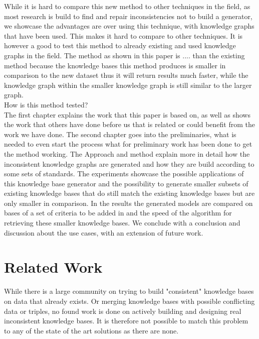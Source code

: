 \documentclass{article}
\begin{document}
While it is hard to compare this new method to other techniques in the field, as most research is build to find and repair inconsistencies not to build a generator, we showcase the advantages are over using this technique, with knowledge graphs that have been used. This makes it hard to compare to other techniques. It is however a good to test this method to already existing and used knowledge graphs in the field. The method as shown in this paper is .... than the existing method because the knowledge bases this method produces is smaller in comparison to the new dataset thus it will return results much faster, while the knowledge graph within the smaller knowledge graph is still similar to the larger graph.\\
How is this method tested?\\
The first chapter explains the work that this paper is based on, as well as shows the work that others have done before us that is related or could benefit from the work we have done. The second chapter goes into the preliminaries, what is needed to even start the process what for preliminary work has been done to get the method working. The Approach and method explain more in detail how the inconsistent knowledge graphs are generated and how they are build according to some sets of standards. The experiments showcase the possible applications of this knowledge base generator and the possibility to generate smaller subsets of existing knowledge bases that do still match the existing knowledge bases but are only smaller in comparison. In the results the generated models are compared on bases of a set of criteria to be added in and the speed of the algorithm for retrieving these smaller knowledge bases. We conclude with a conclusion and discussion about the use cases, with an extension of future work.\\

\newpage
\section{Related Work}
While there is a large community on trying to build "consistent" knowledge bases on data that already exists. Or merging knowledge bases with possible conflicting data or triples, no found work is done on actively building and designing real inconsistent knowledge bases. It is therefore not possible to match this problem to any of the state of the art solutions as there are none. 
\end{document}
